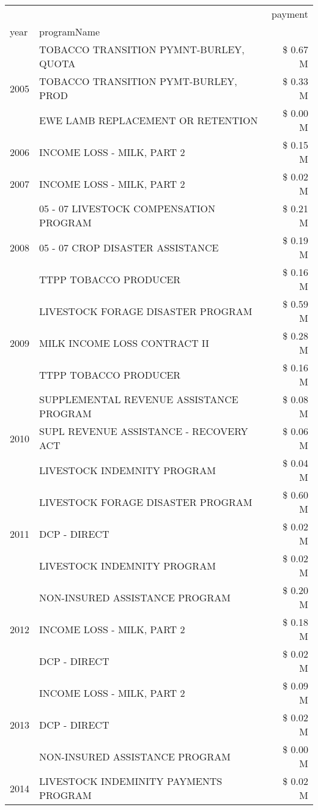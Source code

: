 \begin{tabular}{llr}
\toprule
 &  & payment \\
year & programName &  \\
\midrule
\multirow[t]{3}{*}{2005} & TOBACCO TRANSITION PYMNT-BURLEY, QUOTA & \$ 0.67 M \\
 & TOBACCO TRANSITION PYMT-BURLEY, PROD & \$ 0.33 M \\
 & EWE LAMB REPLACEMENT OR RETENTION & \$ 0.00 M \\
\cline{1-3}
2006 & INCOME LOSS - MILK, PART 2 & \$ 0.15 M \\
\cline{1-3}
2007 & INCOME LOSS - MILK, PART 2 & \$ 0.02 M \\
\cline{1-3}
\multirow[t]{3}{*}{2008} & 05 - 07 LIVESTOCK COMPENSATION PROGRAM & \$ 0.21 M \\
 & 05 - 07 CROP DISASTER ASSISTANCE & \$ 0.19 M \\
 & TTPP TOBACCO PRODUCER & \$ 0.16 M \\
\cline{1-3}
\multirow[t]{3}{*}{2009} & LIVESTOCK FORAGE DISASTER  PROGRAM & \$ 0.59 M \\
 & MILK INCOME LOSS CONTRACT II & \$ 0.28 M \\
 & TTPP TOBACCO PRODUCER & \$ 0.16 M \\
\cline{1-3}
\multirow[t]{3}{*}{2010} & SUPPLEMENTAL REVENUE ASSISTANCE PROGRAM & \$ 0.08 M \\
 & SUPL REVENUE ASSISTANCE - RECOVERY ACT & \$ 0.06 M \\
 & LIVESTOCK INDEMNITY PROGRAM & \$ 0.04 M \\
\cline{1-3}
\multirow[t]{3}{*}{2011} & LIVESTOCK FORAGE DISASTER PROGRAM & \$ 0.60 M \\
 & DCP - DIRECT & \$ 0.02 M \\
 & LIVESTOCK INDEMNITY PROGRAM & \$ 0.02 M \\
\cline{1-3}
\multirow[t]{3}{*}{2012} & NON-INSURED ASSISTANCE PROGRAM & \$ 0.20 M \\
 & INCOME LOSS - MILK, PART 2 & \$ 0.18 M \\
 & DCP - DIRECT & \$ 0.02 M \\
\cline{1-3}
\multirow[t]{3}{*}{2013} & INCOME LOSS - MILK, PART 2 & \$ 0.09 M \\
 & DCP - DIRECT & \$ 0.02 M \\
 & NON-INSURED ASSISTANCE PROGRAM & \$ 0.00 M \\
\cline{1-3}
\multirow[t]{3}{*}{2014} & LIVESTOCK INDEMINITY PAYMENTS PROGRAM & \$ 0.02 M \\

\end{tabular}
